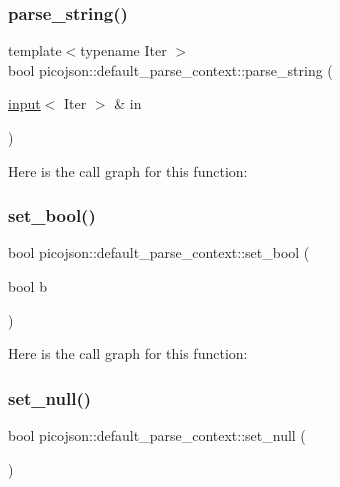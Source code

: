 \subsubsection{\texorpdfstring{parse\+\_\+string()}{parse\_string()}}
{\footnotesize\ttfamily template$<$typename Iter $>$ \\
bool picojson\+::default\+\_\+parse\+\_\+context\+::parse\+\_\+string (\begin{DoxyParamCaption}\item[{\hyperlink{classpicojson_1_1input}{input}$<$ Iter $>$ \&}]{in }\end{DoxyParamCaption})\hspace{0.3cm}{\ttfamily [inline]}}

Here is the call graph for this function\+:
\hypertarget{classpicojson_1_1default__parse__context_ae1935ef455fc2bed9195426cfee5713a}{}\label{classpicojson_1_1default__parse__context_ae1935ef455fc2bed9195426cfee5713a} 
\subsubsection{\texorpdfstring{set\+\_\+bool()}{set\_bool()}}
{\footnotesize\ttfamily bool picojson\+::default\+\_\+parse\+\_\+context\+::set\+\_\+bool (\begin{DoxyParamCaption}\item[{bool}]{b }\end{DoxyParamCaption})\hspace{0.3cm}{\ttfamily [inline]}}

Here is the call graph for this function\+:
\hypertarget{classpicojson_1_1default__parse__context_a2d852ba1f0b115c89378fcb5f10580b5}{}\label{classpicojson_1_1default__parse__context_a2d852ba1f0b115c89378fcb5f10580b5} 
\subsubsection{\texorpdfstring{set\+\_\+null()}{set\_null()}}
{\footnotesize\ttfamily bool picojson\+::default\+\_\+parse\+\_\+context\+::set\+\_\+null (\begin{DoxyParamCaption}{ }\end{DoxyParamCaption})\hspace{0.3cm}{\ttfamily [inline]}}

